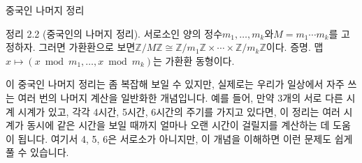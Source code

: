 \documentclass[11pt,a4paper,oneside]{memoir}
\begin{document}
\begin{tcolorbox}[kostyle]
\begin{motivation}
중국인 나머지 정리
\end{motivation}

정리 2.2 (중국인의 나머지 정리). 서로소인 양의 정수$m_1, \ldots, m_k$와$M = m_1 \cdots m_k$를 고정하자. 그러면 가환환으로 보면$\mathbb{Z}/M\mathbb{Z} \cong \mathbb{Z}/m_1\mathbb{Z} \times \cdots \times \mathbb{Z}/m_k\mathbb{Z}$이다. 증명. 맵$x \mapsto (x \bmod m_1, \ldots, x \bmod m_k)$는 가환환 동형이다.

\begin{plainexplain}
  이 중국인 나머지 정리는 좀 복잡해 보일 수 있지만, 실제로는 우리가 일상에서 자주 쓰는 여러 번의 나머지 계산을 일반화한 개념입니다. 예를 들어, 만약 3개의 서로 다른 시계 시계가 있고, 각각 4시간, 5시간, 6시간의 주기를 가지고 있다면, 이 정리는 여러 시계가 동시에 같은 시간을 보일 때까지 얼마나 오랜 시간이 걸릴지를 계산하는 데 도움이 됩니다. 여기서 4, 5, 6은 서로소가 아니지만, 이 개념을 이해하면 이런 문제도 쉽게 풀 수 있습니다.
\end{plainexplain}
\end{tcolorbox}
\vspace{0.8em}
\end{document}
